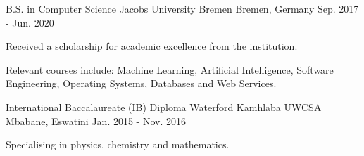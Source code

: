 

\begin{cventries}

  \cventry
    {B.S. in Computer Science} %
    {Jacobs University Bremen} %
    {Bremen, Germany} %
    {Sep. 2017 - Jun. 2020} %
    {
      \begin{cvitems} %
        \item {Received a scholarship for academic excellence from the institution.}
        \item {Relevant courses include: Machine Learning, Artificial Intelligence, Software Engineering, Operating Systems, Databases and Web Services.}
      \end{cvitems}
    }
  \cventry
    {International Baccalaureate (IB) Diploma} %
    {Waterford Kamhlaba UWCSA} %
    {Mbabane, Eswatini} %
    {Jan. 2015 - Nov. 2016} %
    {
      \begin{cvitems} %
        \item {Specialising in physics, chemistry and mathematics.}
      \end{cvitems}
    }
\end{cventries}
